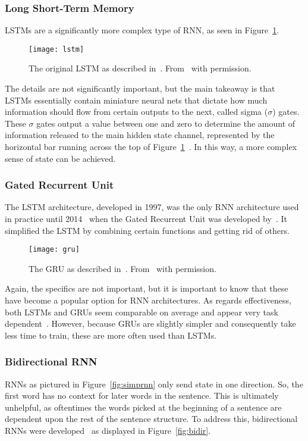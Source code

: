 \subsubsection{Long Short-Term Memory}\label{lstm}
LSTMs are a significantly more complex type of RNN, as seen in Figure~\ref{fig:lstm}.

\begin{figure}[h]
  \centering
  \texttt{[image: lstm]}
  \caption[Original LSTM]{The original LSTM as described in~\cite{Hochreiter1991}. From~\cite{Olah2015} with permission.}
  \label{fig:lstm}
\end{figure}

The details are not significantly important, but the main takeaway is that LSTMs essentially contain miniature neural nets that dictate how much information should flow from certain outputs to the next, called sigma ($\sigma$) gates. These $\sigma$ gates output a value between one and zero to determine the amount of information released to the main hidden state channel, represented by the horizontal bar running across the top of Figure~\ref{fig:lstm}~\cite{Hochreiter1991,Olah2015}. In this way, a more complex sense of state can be achieved.

\subsubsection{Gated Recurrent Unit}\label{gru}
The LSTM architecture, developed in 1997, was the only RNN architecture used in practice until 2014~\cite{Karpathy2015} when the Gated Recurrent Unit was developed by~\cite{Cho2014}. It simplified the LSTM by combining certain functions and getting rid of others.

\begin{figure}[h]
  \centering
  \texttt{[image: gru]}
  \caption[GRU]{The GRU as described in~\cite{Cho2014}. From~\cite{Olah2015} with permission.}
  \label{fig:gru}
\end{figure}

Again, the specifics are not important, but it is important to know that these have become a popular option for RNN architectures. As regards effectiveness, both LSTMs and GRUs seem comparable on average and appear very task dependent~\cite{Jozefowicz2015,Greff2016}. However, because GRUs are slightly simpler and consequently take less time to train, these are more often used than LSTMs.

\subsubsection{Bidirectional RNN}
RNNs as pictured in Figure~\ref{fig:simprnn} only send state in one direction. So, the first word has no context for later words in the sentence. This is ultimately unhelpful, as oftentimes the words picked at the beginning of a sentence are dependent upon the rest of the sentence structure. To address this, bidirectional RNNs were developed~\cite{Schuster1997} as displayed in Figure~\ref{fig:bidir}.

